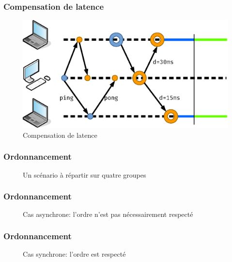 \documentclass[handout]{beamer}
\begin{document}
\begin{frame}
\frametitle{Compensation de latence}
\begin{figure}
	\centering
	\includegraphics[width=\textwidth]{draw/compensated.eps}
	\caption{Compensation de latence}
\end{figure}
\end{frame}

\begin{frame}
\frametitle{Ordonnancement}
\centering
\Large
\begin{figure}
\begin{tikzpicture}[scale=2]

\end{tikzpicture}
\caption{Un scénario à répartir sur quatre groupes}
\end{figure}
\end{frame}

\begin{frame}
\frametitle{Ordonnancement}
\centering
\large
\begin{figure}
	\begin{tikzpicture}[scale=1.1]
	
	\end{tikzpicture}
	\caption{Cas asynchrone: l'ordre n'est pas nécessairement respecté}
\end{figure}
\end{frame}

\begin{frame}
\frametitle{Ordonnancement}
\centering
\large
\begin{figure}
\begin{tikzpicture}[scale=1.1]

\end{tikzpicture}
\caption{Cas synchrone: l'ordre est respecté}
\end{figure}
\end{frame}
\end{document}
